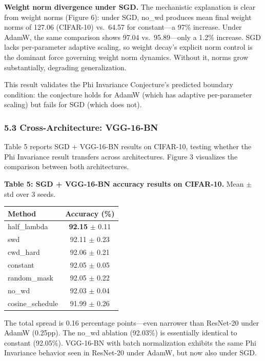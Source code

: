 \documentclass[
]{article}
\begin{document}
\textbf{Weight norm divergence under SGD.} The mechanistic explanation
is clear from weight norms (Figure 6): under SGD, no\_wd produces mean
final weight norms of 127.06 (CIFAR-10) vs.~64.57 for constant---a 97\%
increase. Under AdamW, the same comparison shows 97.04 vs.~95.89---only
a 1.2\% increase. SGD lacks per-parameter adaptive scaling, so weight
decay's explicit norm control is the dominant force governing weight
norm dynamics. Without it, norms grow substantially, degrading
generalization.

This result validates the Phi Invariance Conjecture's predicted boundary
condition: the conjecture holds for AdamW (which has adaptive
per-parameter scaling) but fails for SGD (which does not).

\hypertarget{cross-architecture-vgg-16-bn}{%
\subsubsection{5.3 Cross-Architecture:
VGG-16-BN}\label{cross-architecture-vgg-16-bn}}

Table 5 reports SGD + VGG-16-BN results on CIFAR-10, testing whether the
Phi Invariance result transfers across architectures. Figure 3
visualizes the comparison between both architectures.

\textbf{Table 5: SGD + VGG-16-BN accuracy results on CIFAR-10.} Mean
\(\pm\) std over 3 seeds.

\begin{longtable}[]{@{}lc@{}}
\toprule\noalign{}
Method & Accuracy (\%) \\
\midrule\noalign{}
\endhead
\bottomrule\noalign{}
\endlastfoot
half\_lambda & \textbf{92.15} \(\pm\) 0.11 \\
swd & 92.11 \(\pm\) 0.23 \\
cwd\_hard & 92.06 \(\pm\) 0.21 \\
constant & 92.05 \(\pm\) 0.05 \\
random\_mask & 92.05 \(\pm\) 0.22 \\
no\_wd & 92.03 \(\pm\) 0.04 \\
cosine\_schedule & 91.99 \(\pm\) 0.26 \\
\end{longtable}

The total spread is 0.16 percentage points---even narrower than
ResNet-20 under AdamW (0.25pp). The no\_wd ablation (92.03\%) is
essentially identical to constant (92.05\%). VGG-16-BN with batch
normalization exhibits the same Phi Invariance behavior seen in
ResNet-20 under AdamW, but now also under SGD.
\end{document}

